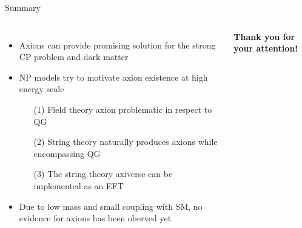 \documentclass[aspectratio=1610, 9pt]{beamer}
\begin{document}
\begin{frame}{Summary}
  \begin{columns}
    \column{\textwidth}
    \begin{itemize}
      \item Axions can provide promising solution for the strong CP problem and dark matter
      \item NP models try to motivate axion existence at high energy scale
      \begin{itemize}
				\item[(1)] Field theory axion problematic in respect to QG
				\item[(2)] String theory naturally produces axions while encompassing QG
				\item[(3)] The string theory axiverse can be implemented as an EFT
      \end{itemize}
      \item Due to low mass and small coupling with SM, no evidence for axions has been oberved yet
    \end{itemize}
    \vspace{1cm}
    \centering
    \textbf{\Huge{\textcolor{tugreen}{Thank you for your attention!}}}
  \end{columns} 
\end{frame}
\end{document}
